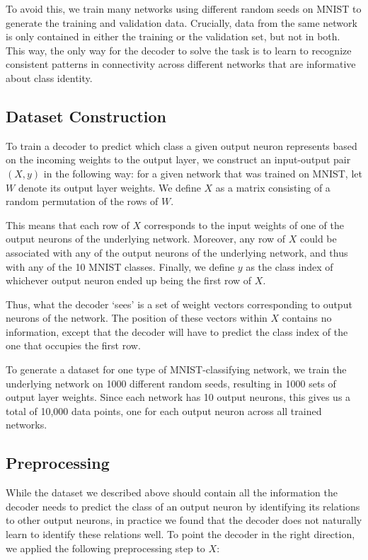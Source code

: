 \documentclass[11pt]{article}
\begin{document}
To avoid this, we train many networks using different random seeds on MNIST to generate the training and validation data. Crucially, data from the same network is only contained in either the training or the validation set, but not in both. This way, the only way for the decoder to solve the task is to learn to recognize consistent patterns in connectivity across different networks that are informative about class identity.

\subsection{Dataset Construction}

To train a decoder to predict which class a given output neuron represents based on the incoming weights to the output layer, we construct an input-output pair $(X, y)$ in the following way: for a given network that was trained on MNIST, let $W$ denote its output layer weights. We define $X$ as a matrix consisting of a random permutation of the rows of $W$.

This means that each row of $X$ corresponds to the input weights of one of the output neurons of the underlying network. Moreover, any row of $X$ could be associated with any of the output neurons of the underlying network, and thus with any of the 10 MNIST classes. Finally, we define $y$ as the class index of whichever output neuron ended up being the first row of $X$.

Thus, what the decoder `sees' is a set of weight vectors corresponding to output neurons of the network. The position of these vectors within $X$ contains no information, except that the decoder will have to predict the class index of the one that occupies the first row.

To generate a dataset for one type of MNIST-classifying network, we train the underlying network on 1000 different random seeds, resulting in 1000 sets of output layer weights. Since each network has 10 output neurons, this gives us a total of 10,000 data points, one for each output neuron across all trained networks.

\subsection{Preprocessing}

While the dataset we described above should contain all the information the decoder needs to predict the class of an output neuron by identifying its relations to other output neurons, in practice we found that the decoder does not naturally learn to identify these relations well. To point the decoder in the right direction, we applied the following preprocessing step to $X$:
\end{document}

